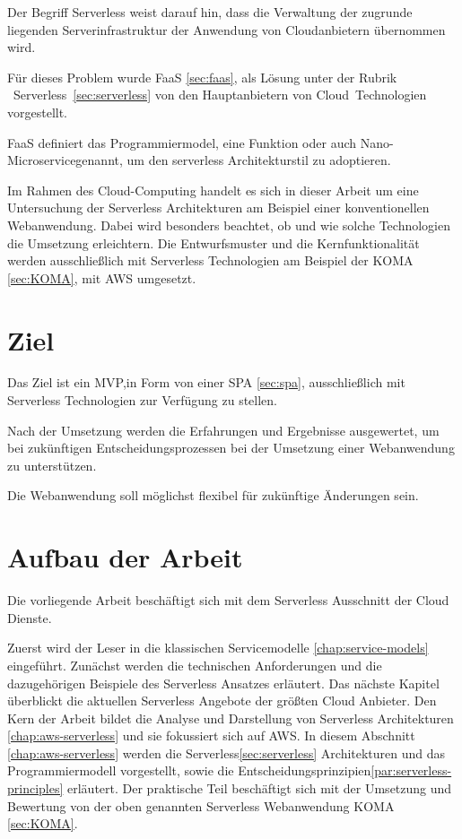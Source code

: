 \documentclass[
12pt,
english,
ngerman,
headsepline,
twoside,
openright,
numbers=noenddot,version=first
]{scrreprt}
\begin{document}
Der Begriff Serverless weist darauf hin, dass die Verwaltung der zugrunde liegenden Serverinfrastruktur der Anwendung von Cloudanbietern übernommen wird. 

Für dieses Problem wurde \acrfull{FaaS} \ref{sec:faas}, als Lösung unter der Rubrik \glqq\ Serverless\grqq\ \ref{sec:serverless} von den Hauptanbietern von \glqq Cloud\grqq\ Technologien vorgestellt.

\acrshort{FaaS} definiert das Programmiermodel, eine Funktion oder auch \glqq Nano-Microservice\grqq genannt, um den serverless Architekturstil zu adoptieren.


Im Rahmen des Cloud-Computing handelt es sich in dieser Arbeit um eine Untersuchung der Serverless Architekturen am Beispiel einer konventionellen Webanwendung. Dabei wird besonders beachtet, ob und wie solche Technologien die Umsetzung erleichtern. Die Entwurfsmuster und die Kernfunktionalität werden ausschließlich mit Serverless Technologien am Beispiel der \acrfull{KOMA} \ref{sec:KOMA}, mit AWS umgesetzt.


\section{Ziel}
\label{sec:task}
Das Ziel ist ein \acrfull{MVP},in Form von einer \acrfull{SPA} \ref{sec:spa}, ausschließlich mit Serverless Technologien zur Verfügung zu stellen.

Nach der Umsetzung werden die Erfahrungen und Ergebnisse ausgewertet, um bei zukünftigen Entscheidungsprozessen bei der Umsetzung einer Webanwendung zu unterstützen.

Die Webanwendung soll möglichst flexibel für zukünftige Änderungen sein.

\section{Aufbau der Arbeit}
\label{sec:layout}

Die vorliegende Arbeit beschäftigt sich mit dem Serverless Ausschnitt der Cloud Dienste. 

Zuerst wird der Leser in die klassischen Servicemodelle \ref{chap:service-models} eingeführt. Zunächst werden die technischen Anforderungen und die dazugehörigen Beispiele des Serverless Ansatzes erläutert.
Das nächste Kapitel überblickt die aktuellen Serverless Angebote der größten Cloud Anbieter.
Den Kern der Arbeit bildet die Analyse und Darstellung von Serverless Architekturen \ref{chap:aws-serverless} und sie fokussiert sich auf \acrfull{AWS}. In diesem Abschnitt \ref{chap:aws-serverless} werden die Serverless\ref{sec:serverless} Architekturen und das Programmiermodell vorgestellt, sowie die Entscheidungsprinzipien\ref{par:serverless-principles} erläutert.
Der praktische Teil beschäftigt sich mit der Umsetzung und Bewertung von der oben genannten Serverless Webanwendung KOMA \ref{sec:KOMA}.
\end{document}
